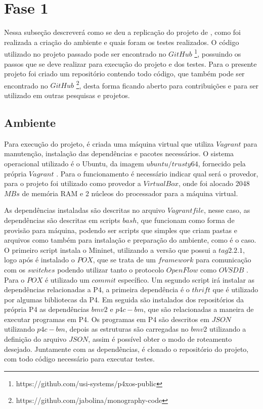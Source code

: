 \documentclass[12pt,
openright, 
oneside,
a4paper,
brazil]{facom-ufu-abntex2}
\theoremstyle{definition}
\begin{document}
\section{Fase 1}
Nessa subseção descreverá como se deu a replicação do projeto de \cite{dang2016paxos}, como foi realizada a criação do ambiente e quais foram os testes
realizados. O código utilizado no projeto passado pode ser encontrado no $GitHub$
\footnote{https://github.com/usi-systems/p4xos-public}, possuindo os passos que
se deve realizar para execução do projeto e dos testes. Para o presente projeto foi 
criado um repositório contendo todo código, que também pode ser encontrado no $GitHub$
\footnote{https://github.com/jabolina/monography-code}, desta forma ficando aberto
para contribuições e para ser utilizado em outras pesquisas e projetos.

\subsection{Ambiente}
Para execução do projeto, é criada uma máquina virtual que utiliza $Vagrant$ para
manutenção, instalação das dependências e pacotes necessários. O sistema operacional
utilizado é o Ubuntu, da imagem $ubuntu/trusty64$, fornecido pela própria
$Vagrant$ \citep{ubuntuTrusty}. Para o funcionamento é necessário indicar qual será
o provedor, para o projeto foi utilizado como provedor a $VirtualBox$, onde foi
alocado 2048 $MBs$ de memória RAM e 2 núcleos do processador para a máquina
virtual.

As dependências instaladas são descritas no arquivo $Vagrantfile$, nesse caso,
as dependências são descritas em scripts $bash$, que funcionam como forma
de provisão para máquina, podendo ser scripts que simples que criam pastas e arquivos
como também para instalação e preparação do ambiente, como é o caso. O primeiro script 
instala o Mininet, utilizando a versão que possui a $tag 2.2.1$, logo após é instalado 
o $POX$, que se trata de um $framework$ para comunicação com os $switches$ podendo 
utilizar tanto o protocolo $OpenFlow$  como $OVSDB$ \citep{poxWiki}. Para o $POX$ 
é utilizado um $commit$ específico. Um segundo script irá instalar as dependências 
relacionadas a P4, a primeira dependência é o $thrift$ que é utilizado por
algumas bibliotecas da P4. Em seguida são instalados dos repositórios da própria P4
as dependências $bmv2$ e $p4c-bm$, que são relacionadas a maneira de executar programas em P4.
Os programas em P4 são descritos em $JSON$ utilizando $p4c-bm$, depois as estruturas são 
carregadas no $bmv2$ utilizando a definição do arquivo $JSON$, assim é possível obter o modo
de roteamento desejado. Juntamente com as dependências, é clonado o repositório do projeto, 
com todo código necessário para executar testes.
\end{document}
